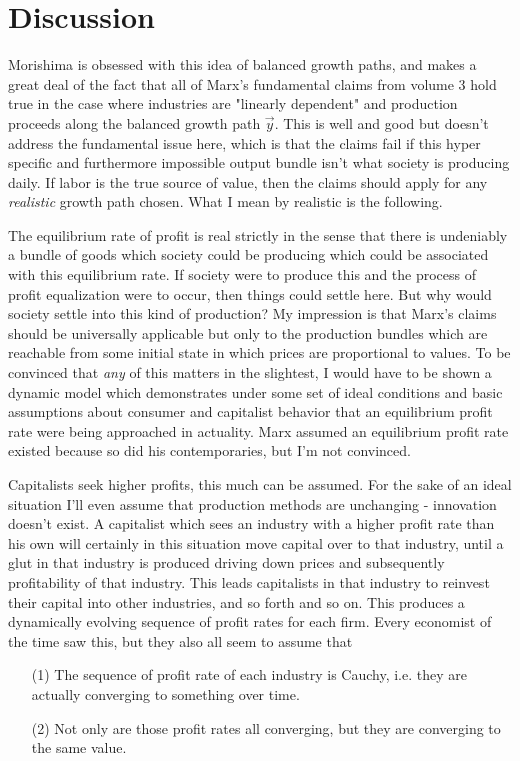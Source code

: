 \documentclass{article}
\theoremstyle{definition}
\theoremstyle{plain}
\theoremstyle{theorem}
\begin{document}
\section{Discussion}
Morishima is obsessed with this idea of balanced growth paths, and makes a great deal of the fact that all of Marx's fundamental claims from volume 3 hold true in the case where industries are "linearly dependent" and production proceeds along the balanced growth path $\vec{y}$. This is well and good but doesn't address the fundamental issue here, which is that the claims fail if this hyper specific and furthermore impossible output bundle isn't what society is producing daily. If labor is the true source of value, then the claims should apply for any \textit{realistic} growth path chosen. What I mean by realistic is the following. \par 
The equilibrium rate of profit is real strictly in the sense that there is undeniably a bundle of goods which society could be producing which could be associated with this equilibrium rate. If society were to produce this and the process of profit equalization were to occur, then things could settle here. But why would society settle into this kind of production? My impression is that Marx's claims should be universally applicable but only to the production bundles which are reachable from some initial state in which prices are proportional to values. To be convinced that \textit{any} of this matters in the slightest, I would have to be shown a dynamic model which demonstrates under some set of ideal conditions and basic assumptions about consumer and capitalist behavior that an equilibrium profit rate were being approached in actuality. Marx assumed an equilibrium profit rate existed because so did his contemporaries, but I'm not convinced. \par 
Capitalists seek higher profits, this much can be assumed. For the sake of an ideal situation I'll even assume that production methods are unchanging - innovation doesn't exist. A capitalist which sees an industry with a higher profit rate than his own will certainly in this situation move capital over to that industry, until a glut in that industry is produced driving down prices and subsequently profitability of that industry. This leads capitalists in that industry to reinvest their capital into other industries, and so forth and so on. This produces a dynamically evolving sequence of profit rates for each firm. Every economist of the time saw this, but they also all seem to assume that
\begin{itemize}
	\item[(1)] The sequence of profit rate of each industry is Cauchy, i.e. they are actually converging to something over time. 
	\item[(2)] Not only are those profit rates all converging, but they are converging to the same value. 
\end{itemize}
\end{document}
